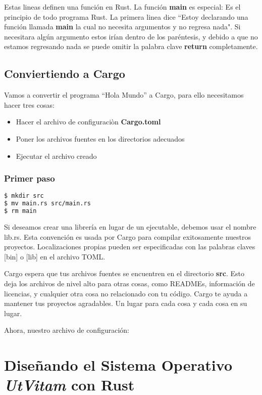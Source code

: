 \documentclass[12pt, twoside]{report}
\begin{document}
Estas lineas definen una función en Rust. La función \textbf{main} es especial: Es el principio de todo programa Rust. La primera linea dice ``Estoy declarando una función llamada \textbf{main} la cual no necesita argumentos y no regresa nada". Si necesitara algún argumento estos irían dentro de los paréntesis, y debido a que no estamos regresando nada se puede omitir la palabra clave \textbf{return} completamente.

\section{Conviertiendo a Cargo}

Vamos a convertir el programa ``Hola Mundo'' a Cargo, para ello necesitamos hacer tres cosas: 

\begin{itemize}
\item Hacer el archivo de configuraciòn \textbf{Cargo.toml}
\item Poner los archivos fuentes en los directorios adecuados
\item Ejecutar el archivo creado
\end{itemize}

\subsection{Primer paso}

\begin{lstlisting}[language=bash]
$ mkdir src
$ mv main.rs src/main.rs 
$ rm main 
\end{lstlisting}

Si deseamos crear una librería en lugar de un ejecutable, debemos usar el nombre lib.rs. Esta convención es usada por Cargo para compilar exitosamente nuestros proyectos. Localizaciones propias pueden ser especificadas con las palabras claves [bin] o [lib] en el archivo TOML.

Cargo espera que tus archivos fuentes se encuentren en el directorio \textbf{src}. Esto deja los archivos de nivel alto para otras cosas, como READMEs, información de licencias, y cualquier otra cosa no relacionado con tu código. Cargo te ayuda a mantener tus proyectos agradables. Un lugar para cada cosa y cada cosa en su lugar.

Ahora, nuestro archivo de configuración:

\chapter{Diseñando el Sistema Operativo \textbf{\textit{UtVitam}} con Rust}
\end{document}
